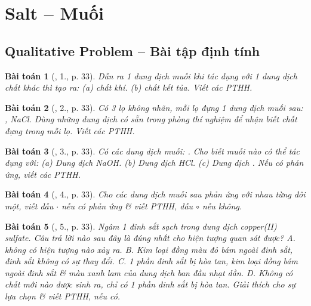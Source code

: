 \documentclass{article}
\newtheorem{baitoan}{Bài toán}
\begin{document}

\section{Salt -- Muối}

\subsection{Qualitative Problem -- Bài tập định tính}

\begin{baitoan}[\cite{SGK_Hoa_Hoc_9}, 1., p. 33]
	Dẫn ra 1 dung dịch muối khi tác dụng với 1 dung dịch chất khác thì tạo ra: (a) chất khí. (b) chất kết tủa. Viết các PTHH.
\end{baitoan}

\begin{baitoan}[\cite{SGK_Hoa_Hoc_9}, 2., p. 33]
	Có 3 lọ không nhãn, mỗi lọ đựng 1 dung dịch muối sau: \emph{, NaCl}. Dùng những dung dịch có sẵn trong phòng thí nghiệm để nhận biết chất đựng trong mỗi lọ. Viết các PTHH.
\end{baitoan}

\begin{baitoan}[\cite{SGK_Hoa_Hoc_9}, 3., p. 33]
	Có các dung dịch muối: \emph{}. Cho biết muối nào có thể tác dụng với: (a) Dung dịch \emph{NaOH}. (b) Dung dịch \emph{HCl}. (c) Dung dịch \emph{}. Nếu có phản ứng, viết các PTHH.
\end{baitoan}

\begin{baitoan}[\cite{SGK_Hoa_Hoc_9}, 4., p. 33]
	Cho các dung dịch muối sau phản ứng với nhau từng đôi một, viết dấu $\cdot$ nếu có phản ứng \& viết PTHH, dấu $\circ$ nếu không.
\end{baitoan}

\begin{baitoan}[\cite{SGK_Hoa_Hoc_9}, 5., p. 33]
	Ngâm 1 đinh sắt sạch trong dung dịch copper(II) sulfate. Câu trả lời nào sau đây là đúng nhất cho hiện tượng quan sát được? {\sf A.} không có hiện tượng nào xảy ra. {\sf B.} Kim loại đồng màu đỏ bám ngoài đinh sắt, đinh sắt không có sự thay đổi. {\sf C.} 1 phần đinh sắt bị hòa tan, kim loại đồng bám ngoài đinh sắt \& màu xanh lam của dung dịch ban đầu nhạt dần. {\sf D.} Không có chất mới nào được sinh ra, chỉ có 1 phần đinh sắt bị hòa tan. Giải thích cho sự lựa chọn \& viết PTHH, nếu có.
\end{baitoan}
\end{document}
